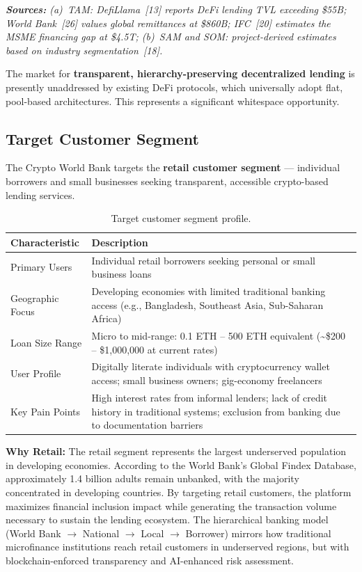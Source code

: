 \documentclass[12pt,a4paper]{report}
\newcommand{\tableheadfont}{\bfseries\small\color{PrimaryBlue}}
\newenvironment{moderntable}[1][H]{%
    \begin{table}[#1]\centering\small%
    \renewcommand{\arraystretch}{1.35}%
}{%
    \end{table}%
}
\begin{document}
\vspace{4pt}
\noindent\textit{\small\textbf{Sources:} (a)~TAM: DefiLlama~[13] reports DeFi lending TVL exceeding \$55B; World Bank~[26] values global remittances at \$860B; IFC~[20] estimates the MSME financing gap at \$4.5T; (b)~SAM and SOM: project-derived estimates based on industry segmentation~[18].}

The market for \textbf{transparent, hierarchy-preserving decentralized lending} is presently unaddressed by existing DeFi protocols, which universally adopt flat, pool-based architectures. This represents a significant whitespace opportunity.

\subsection{Target Customer Segment}

The Crypto World Bank targets the \textbf{retail customer segment} --- individual borrowers and small businesses seeking transparent, accessible crypto-based lending services.

\begin{moderntable}
\caption{Target customer segment profile.}
\begin{tabular}{@{} >{\raggedright}p{3.8cm} >{\raggedright\arraybackslash}p{8.2cm} @{}}
\toprule
\tableheadfont Characteristic & \tableheadfont Description \\
\midrule
\rowcolor{RowShade}
Primary Users & Individual retail borrowers seeking personal or small business loans \\
Geographic Focus & Developing economies with limited traditional banking access (e.g., Bangladesh, Southeast Asia, Sub-Saharan Africa) \\
\rowcolor{RowShade}
Loan Size Range & Micro to mid-range: 0.1 ETH -- 500 ETH equivalent (\textasciitilde\$200 -- \$1,000,000 at current rates) \\
User Profile & Digitally literate individuals with cryptocurrency wallet access; small business owners; gig-economy freelancers \\
\rowcolor{RowShade}
Key Pain Points & High interest rates from informal lenders; lack of credit history in traditional systems; exclusion from banking due to documentation barriers \\
\bottomrule
\end{tabular}
\end{moderntable}

\textbf{Why Retail:} The retail segment represents the largest underserved population in developing economies. According to the World Bank's Global Findex Database, approximately 1.4 billion adults remain unbanked, with the majority concentrated in developing countries. By targeting retail customers, the platform maximizes financial inclusion impact while generating the transaction volume necessary to sustain the lending ecosystem. The hierarchical banking model (World Bank $\to$ National $\to$ Local $\to$ Borrower) mirrors how traditional microfinance institutions reach retail customers in underserved regions, but with blockchain-enforced transparency and AI-enhanced risk assessment.
\end{document}
